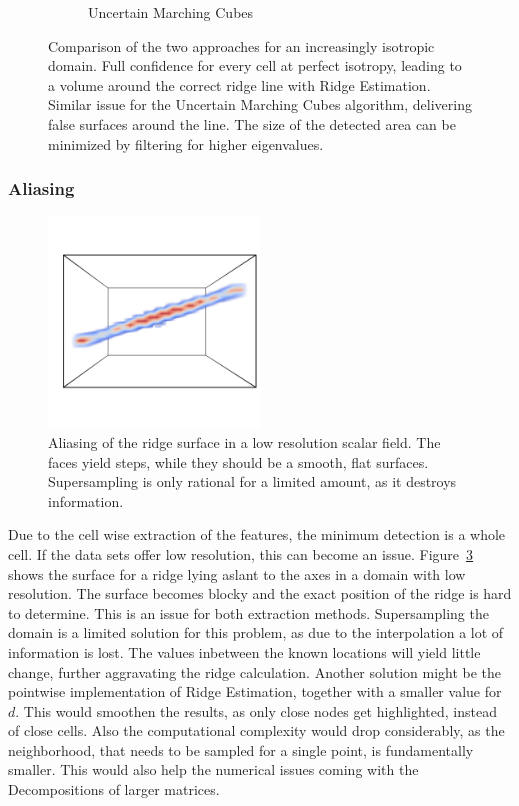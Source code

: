 \begin{figure}[]
\begin{subfigure}{0.49\textwidth}
        \caption{Uncertain Marching Cubes}
        \label{fig:isoUMC}
    \end{subfigure}
    \caption{Comparison of the two approaches for an increasingly
    isotropic domain.  Full confidence for every cell
    at perfect isotropy, leading to a volume around the correct ridge
    line with Ridge Estimation.  Similar issue for
    the Uncertain Marching Cubes algorithm, delivering false surfaces
    around the line. The size of the detected area can be minimized
    by filtering for higher eigenvalues.}
    \label{fig:isoEx}
\end{figure}

\subsubsection{Aliasing}\label{sec:alias}

\begin{figure}
    \centering
    \includegraphics[trim= 0 250 0 250, clip=true, width=0.5\textwidth]{Images/aliasing.png}
    \caption{Aliasing of the ridge surface in a low resolution scalar
    field. The faces yield steps, while they should be a smooth, flat
    surfaces. Supersampling is only rational for a limited amount, as it
    destroys information.}
    \label{fig:alias}
\end{figure}

Due to the cell wise extraction of the features, the minimum detection
is a whole cell. If the data sets offer low resolution, this can become
an issue. Figure~\ref{fig:alias} shows the surface for a ridge lying
aslant to the axes in a domain with low resolution. The surface becomes
blocky and the exact position of the ridge is hard to determine. This is
an issue for both extraction methods. Supersampling the domain is a
limited solution for this problem, as due to the interpolation a lot of
information is lost. The values inbetween the known locations will yield
little change, further aggravating the ridge calculation. Another
solution might be the pointwise implementation of Ridge Estimation,
together with a smaller value for $d$. This would smoothen the results,
as only close nodes get highlighted, instead of close cells. Also the
computational complexity would drop considerably, as the neighborhood,
that needs to be sampled for a single point, is fundamentally smaller.
This would also help the numerical issues coming with the Decompositions
of larger matrices.